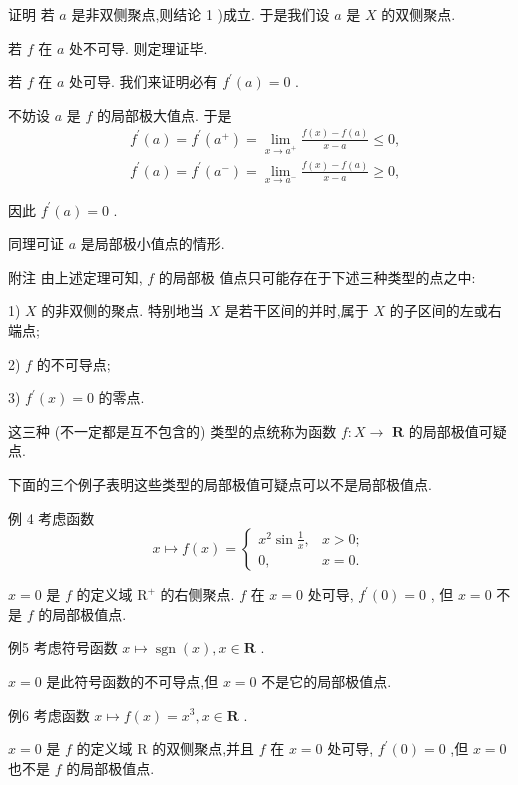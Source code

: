 证明 若 $a$ 是非双侧聚点,则结论 1 )成立. 于是我们设 $a$ 是 $X$ 的双侧聚点.

若 $f$ 在 $a$ 处不可导. 则定理证毕.

若 $f$ 在 $a$ 处可导. 我们来证明必有 ${f}^{\prime }\left( a\right)  = 0$ .

不妨设 $a$ 是 $f$ 的局部极大值点. 于是
\begin{align*}
	&{f}^{\prime }\left( a\right)  = {f}^{\prime }\left( {a}^{ + }\right)  = \mathop{\lim }\limits_{{x \rightarrow  {a}^{ + }}}\frac{f\left( x\right)  - f\left( a\right) }{x - a} \leq  0,\\
	&{f}^{\prime }\left( a\right)  = {f}^{\prime }\left( {a}^{ - }\right)  = \mathop{\lim }\limits_{{x \rightarrow  {a}^{ - }}}\frac{f\left( x\right)  - f\left( a\right) }{x - a} \geq  0,
\end{align*}

因此 ${f}^{\prime }\left( a\right)  = 0$ .

同理可证 $a$ 是局部极小值点的情形.

附注 由上述定理可知, $f$ 的局部极 值点只可能存在于下述三种类型的点之中:

1) $X$ 的非双侧的聚点. 特别地当 $X$ 是若干区间的并时,属于 $X$ 的子区间的左或右端点;

2) $f$ 的不可导点;

3) ${f}^{\prime }\left( x\right)  = 0$ 的零点.

这三种 (不一定都是互不包含的) 类型的点统称为函数 $f : X \rightarrow$  $\mathbf{R}$ 的局部极值可疑点.

下面的三个例子表明这些类型的局部极值可疑点可以不是局部极值点.

例 4 考虑函数
$$x \mapsto  f\left( x\right)  = \left\{  \begin{array}{ll} {x}^{2}\sin \frac{1}{x}, & x > 0; \\  0, & x = 0. \end{array}\right.$$

$x = 0$ 是 $f$ 的定义域 ${\mathrm{R}}^{ + }$ 的右侧聚点. $f$ 在 $x = 0$ 处可导, ${f}^{\prime }\left( 0\right)  = 0$ , 但 $x = 0$ 不是 $f$ 的局部极值点.

例5 考虑符号函数 $x \mapsto  \operatorname{sgn}\left( x\right) ,x \in  \mathbf{R}$ .

$x = 0$ 是此符号函数的不可导点,但 $x = 0$ 不是它的局部极值点.

例6 考虑函数 $x \mapsto  f\left( x\right)  = {x}^{3},x \in  \mathbf{R}$ .

$x = 0$ 是 $f$ 的定义域 $\mathrm{R}$ 的双侧聚点,并且 $f$ 在 $x = 0$ 处可导, ${f}^{\prime }\left( 0\right)  = 0$ ,但 $x = 0$ 也不是 $f$ 的局部极值点.

